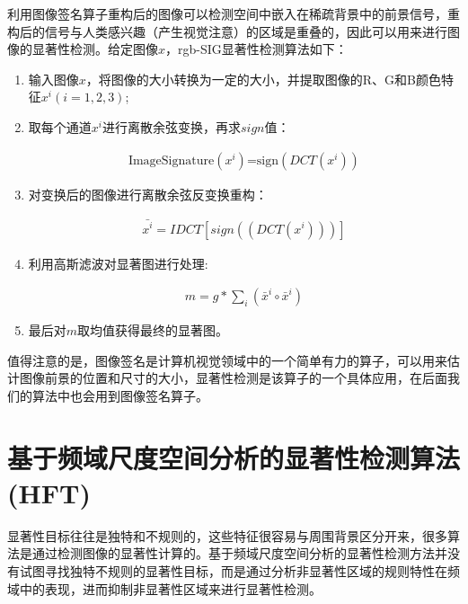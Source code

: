 利用图像签名算子重构后的图像可以检测空间中嵌入在稀疏背景中的前景信号，重构后的信号与人类感兴趣（产生视觉注意）的区域是重叠的，因此可以用来进行图像的显著性检测。给定图像$x$，rgb-SIG显著性检测算法如下：
\begin{enumerate}
\item 输入图像$x$，将图像的大小转换为一定的大小，并提取图像的R、G和B颜色特征$x^{i} (i=1,2,3)$;
\item 取每个通道$x^{i}$进行离散余弦变换，再求$sign$值：
\begin{linenomath}
\begin{align}
\textrm{ImageSignature$(x^{i})$=sign$(DCT(x^{i}))$}
\label{式3_29}
\end{align}
\end{linenomath}
\item 对变换后的图像进行离散余弦反变换重构：
\begin{linenomath}
\begin{align}
\bar{x^{i}}=IDCT[sign((DCT(x^{i})))]
\label{式3_30}
\end{align}
\end{linenomath}
\item 利用高斯滤波对显著图进行处理:
\begin{linenomath}
\begin{align}
m=g\ast\sum_{i}(\bar{x}^{i}\circ\bar{x}^{i})
\label{式3_31}
\end{align}
\end{linenomath}
\item 最后对$m$取均值获得最终的显著图。
\end{enumerate}

值得注意的是，图像签名是计算机视觉领域中的一个简单有力的算子，可以用来估计图像前景的位置和尺寸的大小，显著性检测是该算子的一个具体应用，在后面我们的算法中也会用到图像签名算子。

\section{基于频域尺度空间分析的显著性检测算法(HFT)}
\label{3_6}

显著性目标往往是独特和不规则的，这些特征很容易与周围背景区分开来，很多算法是通过检测图像的显著性计算的。基于频域尺度空间分析的显著性检测方法\cite{LiJianTPAMI2013Scale}并没有试图寻找独特不规则的显著性目标，而是通过分析非显著性区域的规则特性在频域中的表现，进而抑制非显著性区域来进行显著性检测。

